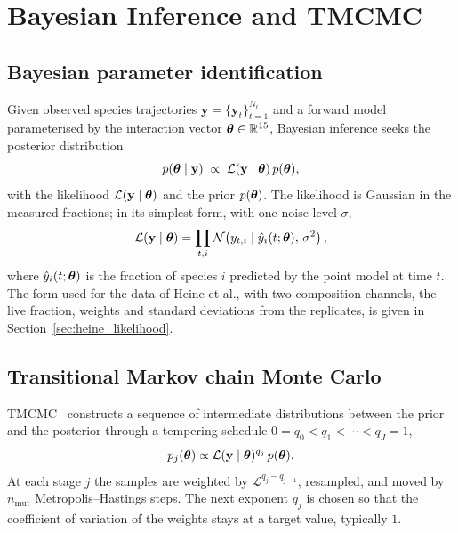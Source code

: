 \section{Bayesian Inference and TMCMC}
\label{sec:theory_tmcmc}

\subsection{Bayesian parameter identification}

Given observed species trajectories $\mathbf{y} = \{\mathbf{y}_t\}_{t=1}^{N_t}$
and a forward model parameterised by the interaction vector
$\boldsymbol{\theta} \in \mathbb{R}^{15}$, Bayesian inference seeks the posterior distribution
\begin{equation}
  p(\boldsymbol{\theta} \mid \mathbf{y}) \;\propto\; \mathcal{L}(\mathbf{y} \mid \boldsymbol{\theta})\,p(\boldsymbol{\theta}),
  \label{eq:bayes}
\end{equation}
with the likelihood $\mathcal{L}(\mathbf{y} \mid \boldsymbol{\theta})$ and the prior
$p(\boldsymbol{\theta})$. The likelihood is Gaussian in the measured fractions; in its simplest
form, with one noise level $\sigma$,
\begin{equation}
  \mathcal{L}(\mathbf{y} \mid \boldsymbol{\theta})
  = \prod_{t,i} \mathcal{N}\!\left(y_{t,i} \mid \hat y_i(t;\boldsymbol{\theta}),\,\sigma^2\right),
\end{equation}
where $\hat y_i(t;\boldsymbol{\theta})$ is the fraction of species $i$ predicted by the point model at time $t$.
The form used for the data of Heine et al., with two composition channels, the live fraction,
weights and standard deviations from the replicates, is given in Section~\ref{sec:heine_likelihood}.

\subsection{Transitional Markov chain Monte Carlo}

TMCMC~\cite{ChingChen2007TMCMC, Betz2016TMCMC} constructs a sequence of
intermediate distributions between the prior and the posterior through a
tempering schedule $0 = q_0 < q_1 < \cdots < q_J = 1$,
\begin{equation}
  p_j(\boldsymbol{\theta}) \propto \mathcal{L}(\mathbf{y} \mid \boldsymbol{\theta})^{q_j}\,p(\boldsymbol{\theta}).
  \label{eq:tmcmc_intermediate}
\end{equation}
At each stage $j$ the samples are weighted by
$\mathcal{L}^{q_j - q_{j-1}}$, resampled, and moved
by $n_{\mathrm{mut}}$ Metropolis--Hastings steps. The next exponent $q_j$ is chosen so
that the coefficient of variation of the weights stays at a target value,
typically $1$.


